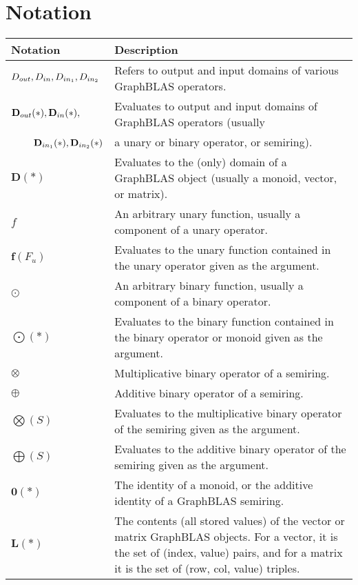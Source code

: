 \vfill



\section{Notation}

\begin{tabular}[H]{l|p{5in}}
Notation & Description \\
\hline
$\mbox{$D_{out}$}, \mbox{$D_{in}$}, \mbox{$D_{in_{1}}$}, \mbox{$D_{in_{2}}$}$  & Refers to output and input domains of various GraphBLAS operators. \\
$\mbox{$\mathbf{D}_{out}$}(*), \mbox{$\mathbf{D}_{in}$}(*),$ & Evaluates to output and input domains of GraphBLAS operators (usually \\
~~~~$\mbox{$\mathbf{D}_{in_{1}}$}(*), \mbox{$\mathbf{D}_{in_{2}}$}(*)$ & a unary or binary operator, or semiring). \\
$\mathbf{D}(*)$   & Evaluates to the (only) domain of a GraphBLAS object (usually a monoid, vector, or matrix). \\ 
$f$             & An arbitrary unary function, usually a component of a unary operator. \\
$\mathbf{f}(F_u)$ & Evaluates to the unary function contained in the unary operator given as the argument. \\
$\odot$         & An arbitrary binary function, usually a component of a binary operator. \\
$\mathbf{\bigodot}(*)$ & Evaluates to the binary function contained in the binary operator or monoid given as the argument. \\
$\otimes$       & Multiplicative binary operator of a semiring. \\
$\oplus$        & Additive binary operator of a semiring. \\
$\mathbf{\bigotimes}(S)$ & Evaluates to the multiplicative binary operator of the semiring given as the argument. \\
$\mathbf{\bigoplus}(S)$ & Evaluates to the additive binary operator of the semiring given as the argument. \\
$\mathbf{0}(*)$   & The identity of a monoid, or the additive identity of a GraphBLAS semiring. \\
$\mathbf{L}(*)$   & The contents (all stored values) of the vector or matrix GraphBLAS objects.  For a vector, it is the set of (index, value) pairs, and for a matrix it is the set of (row, col, value) triples. \\

\end{tabular}
